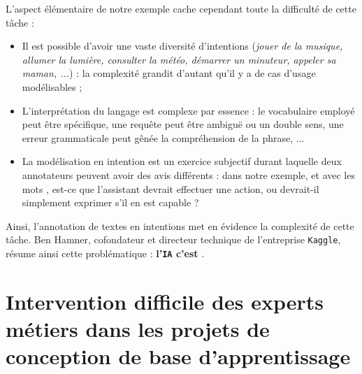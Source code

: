 		L'aspect élémentaire de notre exemple cache cependant toute la difficulté de cette tâche :
		\begin{itemize}
			\item Il est possible d'avoir une vaste diversité d'intentions (\textit{jouer de la musique, allumer la lumière, consulter la météo, démarrer un minuteur, appeler sa maman, ...}) : la complexité grandit d'autant qu'il y a de cas d'usage modélisables ;
			\item L'interprétation du langage est complexe par essence : le vocabulaire employé peut être spécifique, une requête peut être ambiguë ou un double sens, une erreur grammaticale peut gênée la compréhension de la phrase, ...
			\item La modélisation en intention est un exercice subjectif durant laquelle deux annotateurs peuvent avoir des avis différents : dans notre exemple, et avec les mots , est-ce que l'assistant devrait effectuer une action, ou devrait-il simplement exprimer s'il en est capable ?
		\end{itemize}
		
		Ainsi, l'annotation de textes en intentions met en évidence la complexité de cette tâche.
		Ben Hamner, cofondateur et directeur technique de l'entreprise \texttt{Kaggle}, résume ainsi cette problématique : \textbf{l'\texttt{IA} c'est }.
		
		
	\section*{Intervention difficile des experts métiers dans les projets de conception de base d'apprentissage}
		
